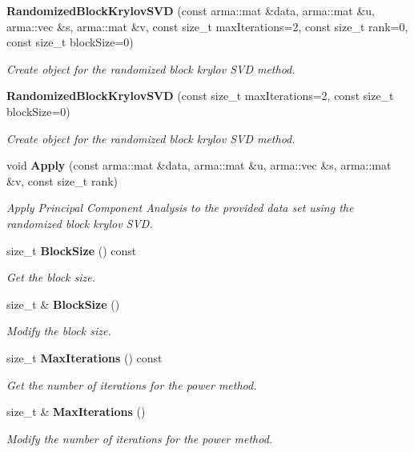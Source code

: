 \begin{DoxyCompactItemize}
\item 
\textbf{ Randomized\+Block\+Krylov\+S\+VD} (const arma\+::mat \&data, arma\+::mat \&u, arma\+::vec \&s, arma\+::mat \&v, const size\+\_\+t max\+Iterations=2, const size\+\_\+t rank=0, const size\+\_\+t block\+Size=0)
\begin{DoxyCompactList}\small\item\em Create object for the randomized block krylov S\+VD method. \end{DoxyCompactList}\item 
\textbf{ Randomized\+Block\+Krylov\+S\+VD} (const size\+\_\+t max\+Iterations=2, const size\+\_\+t block\+Size=0)
\begin{DoxyCompactList}\small\item\em Create object for the randomized block krylov S\+VD method. \end{DoxyCompactList}\item 
void \textbf{ Apply} (const arma\+::mat \&data, arma\+::mat \&u, arma\+::vec \&s, arma\+::mat \&v, const size\+\_\+t rank)
\begin{DoxyCompactList}\small\item\em Apply Principal Component Analysis to the provided data set using the randomized block krylov S\+VD. \end{DoxyCompactList}\item 
size\+\_\+t \textbf{ Block\+Size} () const
\begin{DoxyCompactList}\small\item\em Get the block size. \end{DoxyCompactList}\item 
size\+\_\+t \& \textbf{ Block\+Size} ()
\begin{DoxyCompactList}\small\item\em Modify the block size. \end{DoxyCompactList}\item 
size\+\_\+t \textbf{ Max\+Iterations} () const
\begin{DoxyCompactList}\small\item\em Get the number of iterations for the power method. \end{DoxyCompactList}\item 
size\+\_\+t \& \textbf{ Max\+Iterations} ()
\begin{DoxyCompactList}\small\item\em Modify the number of iterations for the power method. \end{DoxyCompactList}\end{DoxyCompactItemize}


